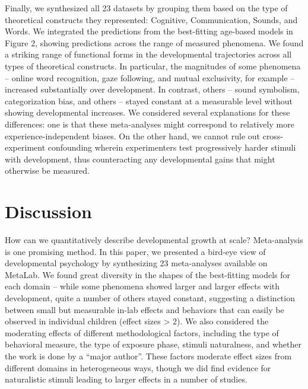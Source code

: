 \documentclass[10pt, letterpaper]{article}
\begin{document}
Finally, we synthesized all 23 datasets by grouping them based on the
type of theoretical constructs they represented: Cognitive,
Communication, Sounds, and Words. We integrated the predictions from the
best-fitting age-based models in Figure 2, showing predictions across
the range of measured phenomena. We found a striking range of functional
forms in the developmental trajectories across all types of theoretical
constructs. In particular, the magnitudes of some phenomena -- online
word recognition, gaze following, and mutual exclusivity, for example --
increased substantially over development. In contrast, others -- sound
symbolism, categorization bias, and others -- stayed constant at a
measurable level without showing developmental increases. We considered
several explanations for these differences: one is that these
meta-analyses might correspond to relatively more experience-independent
biases. On the other hand, we cannot rule out cross-experiment
confounding wherein experimenters test progressively harder stimuli with
development, thus counteracting any developmental gains that might
otherwise be measured.

\hypertarget{discussion}{%
\section{Discussion}\label{discussion}}

How can we quantitatively describe developmental growth at scale?
Meta-analysis is one promising method. In this paper, we presented a
bird-eye view of developmental psychology by synthesizing 23
meta-analyses available on MetaLab. We found great diversity in the
shapes of the best-fitting models for each domain -- while some
phenomena showed larger and larger effects with development, quite a
number of others stayed constant, suggesting a distinction between small
but measurable in-lab effects and behaviors that can easily be observed
in individual children (effect sizes \textgreater{} 2). We also
considered the moderating effects of different methodological factors,
including the type of behavioral measure, the type of exposure phase,
stimuli naturalness, and whether the work is done by a ``major author''.
These factors moderate effect sizes from different domains in
heterogeneous ways, though we did find evidence for naturalistic stimuli
leading to larger effects in a number of studies.
\end{document}
